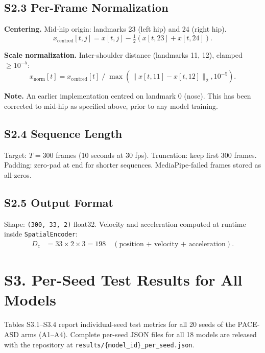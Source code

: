 \documentclass[12pt,a4paper]{article}
\begin{document}
\subsection{S2.3 Per-Frame Normalization}

\textbf{Centering.}
Mid-hip origin: landmarks 23 (left hip) and 24 (right hip).
\begin{equation}
  x_\text{centred}[t,j] = x[t,j] - \tfrac{1}{2}(x[t,23] + x[t,24]).
\end{equation}

\textbf{Scale normalization.}
Inter-shoulder distance (landmarks 11, 12), clamped $\ge 10^{-5}$:
\begin{equation}
  x_\text{norm}[t] = x_\text{centred}[t] \;/\; \max(\|x[t,11] - x[t,12]\|_2, 10^{-5}).
\end{equation}

\textbf{Note.}
An earlier implementation centred on landmark 0 (nose).
This has been corrected to mid-hip as specified above, prior to any model training.

\subsection{S2.4 Sequence Length}

Target: $T = 300$ frames (10 seconds at 30 fps).
Truncation: keep first 300 frames.
Padding: zero-pad at end for shorter sequences.
MediaPipe-failed frames stored as all-zeros.

\subsection{S2.5 Output Format}

Shape: \texttt{(300, 33, 2)} float32.
Velocity and acceleration computed at runtime inside \texttt{SpatialEncoder}:
\begin{align}
  D_c &= 33 \times 2 \times 3 = 198 \quad (\text{position + velocity + acceleration}).
\end{align}

\section{S3. Per-Seed Test Results for All Models}
\label{sec:s3}

Tables S3.1--S3.4 report individual-seed test metrics for all 20 seeds of
the PACE-ASD arms (A1--A4).
Complete per-seed JSON files for all 18 models are released with the repository
at \texttt{results/\{model\_id\}\_per\_seed.json}.
\end{document}
